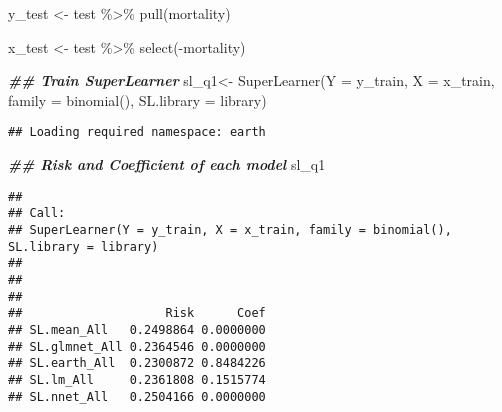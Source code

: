\documentclass[
]{article}
\newenvironment{Shaded}{\begin{snugshade}}{\end{snugshade}}
\newcommand{\AttributeTok}[1]{\textcolor[rgb]{0.77,0.63,0.00}{#1}}
\newcommand{\DocumentationTok}[1]{\textcolor[rgb]{0.56,0.35,0.01}{\textbf{\textit{#1}}}}
\newcommand{\FunctionTok}[1]{\textcolor[rgb]{0.00,0.00,0.00}{#1}}
\newcommand{\NormalTok}[1]{#1}
\newcommand{\OtherTok}[1]{\textcolor[rgb]{0.56,0.35,0.01}{#1}}
\newcommand{\SpecialCharTok}[1]{\textcolor[rgb]{0.00,0.00,0.00}{#1}}
\begin{document}
\begin{Shaded}
\begin{Highlighting}[]
\NormalTok{y\_test }\OtherTok{\textless{}{-}}\NormalTok{ test }\SpecialCharTok{\%\textgreater{}\%}
  \FunctionTok{pull}\NormalTok{(mortality)}

\NormalTok{x\_test }\OtherTok{\textless{}{-}}\NormalTok{ test }\SpecialCharTok{\%\textgreater{}\%}
  \FunctionTok{select}\NormalTok{(}\SpecialCharTok{{-}}\NormalTok{mortality)}

\DocumentationTok{\#\# Train SuperLearner}
\NormalTok{sl\_q1}\OtherTok{\textless{}{-}} \FunctionTok{SuperLearner}\NormalTok{(}\AttributeTok{Y =}\NormalTok{ y\_train,}
                         \AttributeTok{X =}\NormalTok{ x\_train,}
                         \AttributeTok{family =} \FunctionTok{binomial}\NormalTok{(),}
                         \AttributeTok{SL.library =}\NormalTok{ library)}
\end{Highlighting}
\end{Shaded}

\begin{verbatim}
## Loading required namespace: earth
\end{verbatim}

\begin{Shaded}
\begin{Highlighting}[]
\DocumentationTok{\#\# Risk and Coefficient of each model}
\NormalTok{sl\_q1}
\end{Highlighting}
\end{Shaded}

\begin{verbatim}
## 
## Call:  
## SuperLearner(Y = y_train, X = x_train, family = binomial(), SL.library = library) 
## 
## 
## 
##                    Risk      Coef
## SL.mean_All   0.2498864 0.0000000
## SL.glmnet_All 0.2364546 0.0000000
## SL.earth_All  0.2300872 0.8484226
## SL.lm_All     0.2361808 0.1515774
## SL.nnet_All   0.2504166 0.0000000
\end{verbatim}
\end{document}
